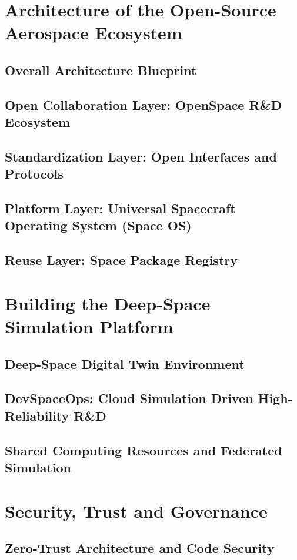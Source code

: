 \documentclass[11pt]{article}
\begin{document}
\section{Architecture of the Open-Source Aerospace Ecosystem}
\subsection{Overall Architecture Blueprint}
\subsection{Open Collaboration Layer: OpenSpace R\&D Ecosystem}
\subsection{Standardization Layer: Open Interfaces and Protocols}
\subsection{Platform Layer: Universal Spacecraft Operating System (Space OS)}
\subsection{Reuse Layer: Space Package Registry}

\section{Building the Deep-Space Simulation Platform}
\subsection{Deep-Space Digital Twin Environment}
\subsection{DevSpaceOps: Cloud Simulation Driven High-Reliability R\&D}
\subsection{Shared Computing Resources and Federated Simulation}

\section{Security, Trust and Governance}
\subsection{Zero-Trust Architecture and Code Security}
\end{document}
